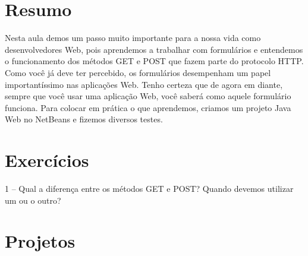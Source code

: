 \section{Resumo}

Nesta aula demos um passo muito importante para a nossa vida como desenvolvedores Web, pois aprendemos a trabalhar com formulários e entendemos o funcionamento dos métodos GET e POST que fazem parte do protocolo HTTP. Como você já deve ter percebido, os formulários desempenham um papel importantíssimo nas aplicações Web. Tenho certeza que de agora em diante, sempre que você usar uma aplicação Web, você saberá como aquele formulário funciona. Para colocar em prática o que aprendemos, criamos um projeto Java Web no NetBeans e fizemos diversos testes.

\section{Exercícios}

1 – Qual a diferença entre os métodos GET e POST? Quando devemos utilizar um ou o outro?

\section{Projetos}


